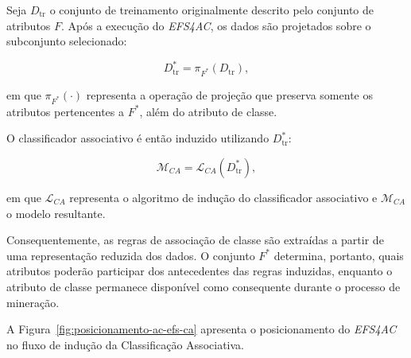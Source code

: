 Seja $D_{\mathrm{tr}}$ o conjunto de treinamento originalmente descrito pelo
conjunto de atributos $F$. Após a execução do \textit{EFS4AC}, os dados são
projetados sobre o subconjunto selecionado:

\begin{equation}
    D_{\mathrm{tr}}^{*}
    =
    \pi_{F^{*}}
    \left(
        D_{\mathrm{tr}}
    \right),
    \label{eq:projecao-treino-ca-ac-efs}
\end{equation}

em que $\pi_{F^{*}}(\cdot)$ representa a operação de projeção que preserva
somente os atributos pertencentes a $F^{*}$, além do atributo de classe.

O classificador associativo é então induzido utilizando $D_{\mathrm{tr}}^{*}$:

\begin{equation}
    \mathcal{M}_{CA}
    =
    \mathcal{L}_{CA}
    \left(
        D_{\mathrm{tr}}^{*}
    \right),
    \label{eq:inducao-ca-ac-efs}
\end{equation}

em que $\mathcal{L}_{CA}$ representa o algoritmo de indução do classificador
associativo e $\mathcal{M}_{CA}$ o modelo resultante.

Consequentemente, as regras de associação de classe são extraídas a partir de
uma representação reduzida dos dados. O conjunto $F^{*}$ determina, portanto,
quais atributos poderão participar dos antecedentes das regras induzidas,
enquanto o atributo de classe permanece disponível como consequente durante
o processo de mineração.

A Figura~\ref{fig:posicionamento-ac-efs-ca} apresenta o posicionamento do
\textit{EFS4AC} no fluxo de indução da Classificação Associativa.

